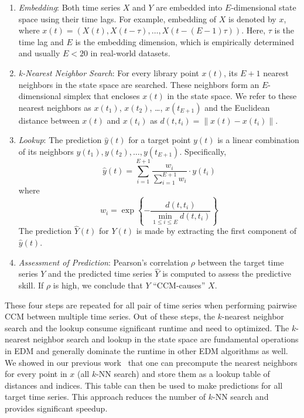 \documentclass[sigconf]{acmart}
\begin{document}
\begin{enumerate}
    \item \textit{Embedding}: Both time series $X$ and $Y$ are embedded into
        $E$-dimensional state space using their time lags. For example, embedding
        of $X$ is denoted by $x$, where $x(t)=(X(t), X(t-\tau),
        \dots, X(t-(E-1) \tau))$. Here, $\tau$ is the time lag and $E$ is
        the embedding dimension, which is
        empirically determined and usually $E<20$ in real-world datasets.
    \item \textit{k-Nearest Neighbor Search}: For every library point $x(t)$,
         its $E+1$ nearest neighbors in the state space are searched. These
         neighbors form an $E$-dimensional simplex that encloses $x(t)$ in the
         state space. We refer to these nearest neighbors as $x(t_1)$, $x(t_2)$,
         \dots, $x(t_{E+1})$ and the Euclidean distance between $x(t)$ and
         $x(t_i)$ as $d(t, t_i) =\lVert x(t) - x(t_i)
        \rVert$.
    \item \textit{Lookup}: The prediction $\hat{y}(t)$ for a target point $y(t)$ is a
        linear combination of its neighbors $y(t_1), y(t_2), \dots, y(t_{E+1})$.
        Specifically,
        \begin{equation*}
            \hat{y}(t) = \sum^{E+1}_{i=1} \frac{w_i}{\sum^{E+1}_{i=1}{w_i}} \cdot y(t_i)
        \end{equation*}
        where
        \begin{equation*}
            w_i = \exp\left\{ -\frac{d(t, t_i)}{\min\limits_{1\leq i \leq E}{d(t, t_i)}}\right\}
        \end{equation*}
        The prediction $\hat{Y}(t)$ for $Y(t)$ is made by extracting the first
        component of $\hat{y}(t)$.
    \item \textit{Assessment of Prediction}: Pearson's correlation $\rho$
        between the target time series $Y$ and the predicted time series $\hat{Y}$
        is computed to assess the predictive skill.
        If $\rho$ is high, we conclude that $Y$ ``CCM-causes'' $X$.
\end{enumerate}

These four steps are repeated for all pair of time series when performing pairwise
CCM between multiple time series. Out of these steps, the $k$-nearest neighbor
search and the lookup consume significant runtime and need to optimized.
The $k$-nearest neighbor search and lookup in the state space are fundamental operations in EDM and generally dominate the runtime in other EDM algorithms as well.
We showed in our previous work~\cite{mpedm} that one can precompute the nearest
neighbors for every point in $x$ (all $k$-NN search) and store them as a lookup
table of distances and indices. This table can then be used to make
predictions for all target time series. This approach reduces the number of
$k$-NN search and provides significant speedup.
\end{document}
